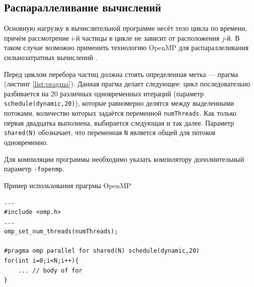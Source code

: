 \subsection{Распараллеливание вычислений}

Основную нагрузку в вычислительной программе несёт тело цикла по времени, причём  рассмотрение $i$-й частицы в цикле не зависит от расположения $j$-й. В таком случае возможно применить технологию OpenMP для распараллеливания сильнозатратных вычислений \cite{openMPbook}.

Перед циклом перебора частиц должна стоять определенная метка --- прагма (листинг \ref{list:pragma}). Данная прагма делает следующее: цикл последовательно разбивается на 20 различных одновременных итераций (параметр \texttt{schedule(dynamic,20)}), которые равномерно делятся между выделенными потоками, количество которых задаётся переменной \texttt{numThreads}.  Как только первая двадцатка выполнена, выбирается следующая и так далее. Параметр \texttt{shared(N)} обозначает, что переменная \texttt{N} является общей для потоков одновременно.

Для компиляции программы необходимо указать компилятору дополнительный параметр \texttt{-fopenmp}.

\begin{ListingEnv}[h!]
    \caption{Пример использования прагрмы OpenMP}
    \label{list:pragma}
\begin{lstlisting}[language={[ISO]C++}]
...
#include <omp.h>
...
omp_set_num_threads(numThreads);

#pragma omp parallel for shared(N) schedule(dynamic,20) 
for(int i=0;i<N;i++){
	... // body of for
}
\end{lstlisting}
\end{ListingEnv}%

